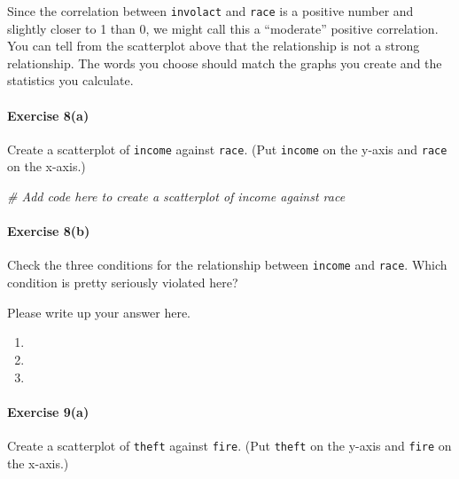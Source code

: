 \documentclass[
]{book}
\newenvironment{Shaded}{\begin{snugshade}}{\end{snugshade}}
\newcommand{\CommentTok}[1]{\textcolor[rgb]{0.56,0.35,0.01}{\textit{#1}}}
\providecommand{\tightlist}{%
  \setlength{\itemsep}{0pt}\setlength{\parskip}{0pt}}
\begin{document}
Since the correlation between \texttt{involact} and \texttt{race} is a positive number and slightly closer to 1 than 0, we might call this a ``moderate'' positive correlation. You can tell from the scatterplot above that the relationship is not a strong relationship. The words you choose should match the graphs you create and the statistics you calculate.

\hypertarget{exercise-8a-1}{%
\paragraph*{Exercise 8(a)}\label{exercise-8a-1}}

Create a scatterplot of \texttt{income} against \texttt{race}. (Put \texttt{income} on the y-axis and \texttt{race} on the x-axis.)

\begin{Shaded}
\begin{Highlighting}[]
\CommentTok{\# Add code here to create a scatterplot of income against race}
\end{Highlighting}
\end{Shaded}

\hypertarget{exercise-8b-1}{%
\paragraph*{Exercise 8(b)}\label{exercise-8b-1}}

Check the three conditions for the relationship between \texttt{income} and \texttt{race}. Which condition is pretty seriously violated here?

Please write up your answer here.

\begin{enumerate}
\def\labelenumi{\arabic{enumi}.}
\tightlist
\item
\item
\item
\end{enumerate}

\hypertarget{exercise-9a-2}{%
\paragraph*{Exercise 9(a)}\label{exercise-9a-2}}

Create a scatterplot of \texttt{theft} against \texttt{fire}. (Put \texttt{theft} on the y-axis and \texttt{fire} on the x-axis.)
\end{document}
